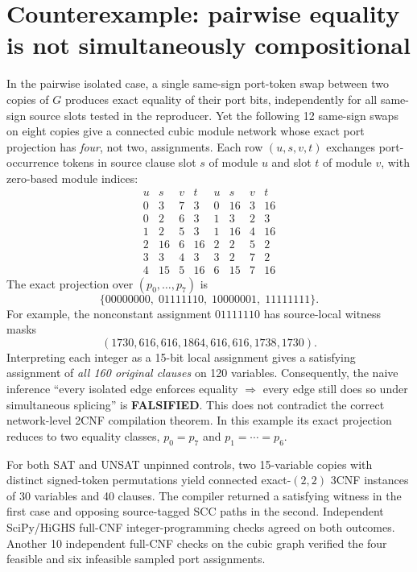 \documentclass[11pt]{article}
\begin{document}
\section{Counterexample: pairwise equality is not simultaneously compositional}
In the pairwise isolated case, a single same-sign port-token swap between two copies of $G$ produces exact equality of their port bits, independently for all same-sign source slots tested in the reproducer. Yet the following 12 same-sign swaps on eight copies give a connected cubic module network whose exact port projection has \emph{four}, not two, assignments. Each row $(u,s,v,t)$ exchanges port-occurrence tokens in source clause slot $s$ of module $u$ and slot $t$ of module $v$, with zero-based module indices:
\[
\begin{array}{rrrr|rrrr}
u&s&v&t&u&s&v&t\\\hline
0&3&7&3&0&16&3&16\\
0&2&6&3&1&3&2&3\\
1&2&5&3&1&16&4&16\\
2&16&6&16&2&2&5&2\\
3&3&4&3&3&2&7&2\\
4&15&5&16&6&15&7&16
\end{array}
\]
The exact projection over $(p_0,\ldots,p_7)$ is
\[
 \boxed{\{00000000,\;01111110,\;10000001,\;11111111\}.}
\]
For example, the nonconstant assignment $01111110$ has source-local witness masks
\[
 (1730,616,616,1864,616,616,1738,1730).
\]
Interpreting each integer as a 15-bit local assignment gives a satisfying assignment of \emph{all 160 original clauses} on 120 variables. Consequently, the naive inference ``every isolated edge enforces equality $\Rightarrow$ every edge still does so under simultaneous splicing'' is \textbf{FALSIFIED}. This does not contradict the correct network-level 2CNF compilation theorem. In this example its exact projection reduces to two equality classes, $p_0=p_7$ and $p_1=\cdots=p_6$.

For both SAT and UNSAT unpinned controls, two 15-variable copies with distinct signed-token permutations yield connected exact-$(2,2)$ 3CNF instances of 30 variables and 40 clauses. The compiler returned a satisfying witness in the first case and opposing source-tagged SCC paths in the second. Independent SciPy/HiGHS full-CNF integer-programming checks agreed on both outcomes. Another 10 independent full-CNF checks on the cubic graph verified the four feasible and six infeasible sampled port assignments.
\end{document}
